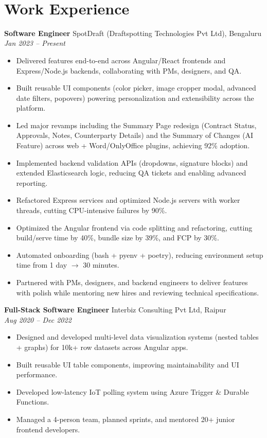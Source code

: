 \documentclass[a4paper,10pt]{article}
\begin{document}
\begin{center}
    {\LARGE \textbf{\ContactName}} \\[4pt]
    \ContactLine{\,|\,}
\end{center}

\section*{Work Experience}

\textbf{Software Engineer} \hfill SpotDraft (Draftspotting Technologies Pvt Ltd), Bengaluru \\
\textit{Jan 2023 -- Present}
\begin{itemize}
    \item Delivered features end-to-end across Angular/React frontends and Express/Node.js backends, collaborating with PMs, designers, and QA.
    \item Built reusable UI components (color picker, image cropper modal, advanced date filters, popovers) powering personalization and extensibility across the platform.
    \item Led major revamps including the Summary Page redesign (Contract Status, Approvals, Notes, Counterparty Details) and the Summary of Changes (AI Feature) across web + Word/OnlyOffice plugins, achieving 92\% adoption.
    \item Implemented backend validation APIs (dropdowns, signature blocks) and extended Elasticsearch logic, reducing QA tickets and enabling advanced reporting.
    \item Refactored Express services and optimized Node.js servers with worker threads, cutting CPU-intensive failures by 90\%.
    \item Optimized the Angular frontend via code splitting and refactoring, cutting build/serve time by 40\%, bundle size by 39\%, and FCP by 30\%.
    \item Automated onboarding (bash + pyenv + poetry), reducing environment setup time from 1 day $\rightarrow$ 30 minutes.
    \item Partnered with PMs, designers, and backend engineers to deliver features with polish while mentoring new hires and reviewing technical specifications.
\end{itemize}

\textbf{Full-Stack Software Engineer} \hfill Interbiz Consulting Pvt Ltd, Raipur \\
\textit{Aug 2020 -- Dec 2022}
\begin{itemize}
    \item Designed and developed multi-level data visualization systems (nested tables + graphs) for 10k+ row datasets across Angular apps.
    \item Built reusable UI table components, improving maintainability and UI performance.
    \item Developed low-latency IoT polling system using Azure Trigger \& Durable Functions.
    \item Managed a 4-person team, planned sprints, and mentored 20+ junior frontend developers.
\end{itemize}
\end{document}
